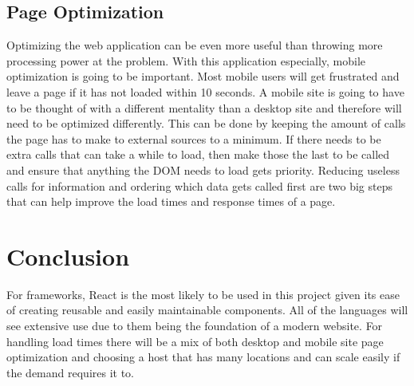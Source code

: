 \documentclass[onecolumn, draftclsnofoot,10pt, compsoc]{IEEEtran}
\begin{document}
\subsection{Page Optimization}
Optimizing the web application can be even more useful than throwing more processing power at the problem.
With this application especially, mobile optimization is going to be important. 
Most mobile users will get frustrated and leave a page if it has not loaded within 10 seconds. \cite{14}
A mobile site is going to have to be thought of with a different mentality than a desktop site and therefore will need to be optimized differently.
This can be done by keeping the amount of calls the page has to make to external sources to a minimum. \cite{14}
If there needs to be extra calls that can take a while to load, then make those the last to be called and ensure that anything the DOM needs to load gets priority.
Reducing useless calls for information and ordering which data gets called first are two big steps that can help improve the load times and response times of a page. \cite{14}

\section{Conclusion}
For frameworks, React is the most likely to be used in this project given its ease of creating reusable and easily maintainable components. 
All of the languages will see extensive use due to them being the foundation of a modern website.
For handling load times there will be a mix of both desktop and mobile site page optimization and choosing a host that has many locations and can scale easily if the demand requires it to.


\end{document}
